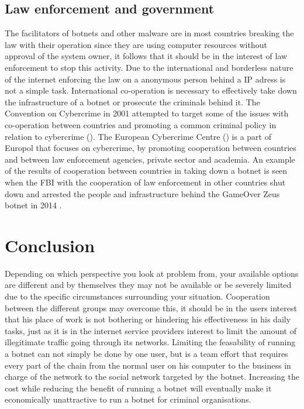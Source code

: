 \subsection{Law enforcement and government}
The facilitators of botnets and other malware are in most countries breaking the law with their operation since they are using computer resources without approval of the system owner, it follows that it should be in the interest of law enforcement to stop this activity. Due to the international and borderless nature of the internet enforcing the law on a anonymous person behind a IP adress is not a simple task. International co-operation is necessary to effectively take down the infrastructure of a botnet or prosecute the criminals behind it. The Convention on Cybercrime in 2001 attempted to target some of the issues with co-operation between countries and promoting a common criminal policy in relation to cybercrime (\cite{jan-coc}). The European Cybercrime Centre (\cite{jan-ec3}) is a part of Europol that focuses on cybercrime, by promoting cooperation between countries and between law enforcement agencies, private sector and academia.
An example of the results of cooperation between countries in taking down a botnet is seen when the FBI with the cooperation of law enforcement in other countries shut down and arrested the people and infrastructure behind the GameOver Zeus botnet in 2014 \cite{jan-fbi-GOZ, jan-fbi-GOZ2}.


\section{Conclusion}

Depending on which perspective you look at problem from, your available options are different and by themselves they may not be available or be severely limited due to the specific circumstances surrounding your situation. Cooperation between the different groups may overcome this, it should be in the users interest that his place of work is not bothering or hindering his effectiveness in his daily tasks, just as it is in the internet service providers interest to limit the amount of illegitimate traffic going through its networks. Limiting the feasability of running a botnet can not simply be done by one user, but is a team effort that requires every part of the chain from the normal user on his computer to the business in charge of the network to the social network targeted by the botnet.
Increasing the cost while reducing the benefit of running a botnet will eventually make it economically unattractive to run a botnet for criminal organisations.


